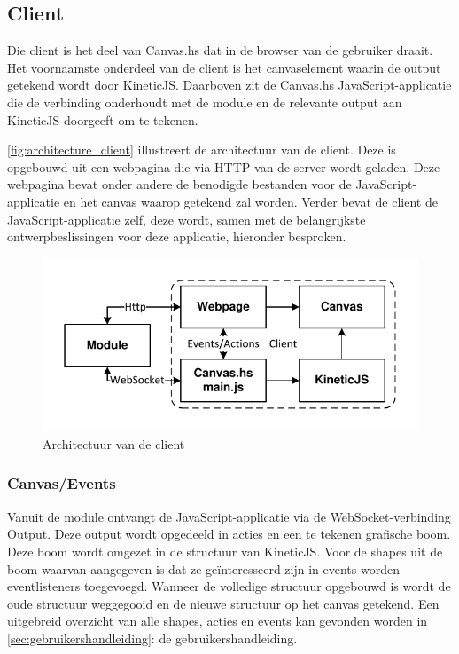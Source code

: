 
\subsection{Client}
Die client is het deel van Canvas.hs dat in de browser van de gebruiker draait. Het voornaamste onderdeel van de client is het canvaselement waarin de output getekend wordt door KineticJS. Daarboven zit de Canvas.hs JavaScript-applicatie die de verbinding onderhoudt met de module en de relevante output aan KineticJS doorgeeft om te tekenen.

\autoref{fig:architecture_client} illustreert de architectuur van de client. Deze is opgebouwd uit een webpagina die via HTTP van de server wordt geladen. Deze webpagina bevat onder andere de benodigde bestanden voor de JavaScript-applicatie en het canvas waarop getekend zal worden. Verder bevat de client de JavaScript-applicatie zelf, deze wordt, samen met de belangrijkste ontwerpbeslissingen voor deze applicatie, hieronder besproken.

\begin{figure}
\begin{center}
\includegraphics[keepaspectratio,width=\textwidth]{./images/client_architecture.pdf}
\caption{Architectuur van de client}
\label{fig:architecture_client}
\end{center}
\end{figure}

\subsubsection{Canvas/Events}
Vanuit de module ontvangt de JavaScript-applicatie via de WebSocket-verbinding Output. Deze output wordt opgedeeld in acties en een te tekenen grafische boom. Deze boom wordt omgezet in de structuur van KineticJS. Voor de shapes uit de boom waarvan aangegeven is dat ze ge\"interesseerd zijn in events worden eventlisteners toegevoegd. Wanneer de volledige structuur opgebouwd is wordt de oude structuur weggegooid en de nieuwe structuur op het canvas getekend. Een uitgebreid overzicht van alle shapes, acties en events kan gevonden worden in \autoref{sec:gebruikershandleiding}: de gebruikershandleiding.

